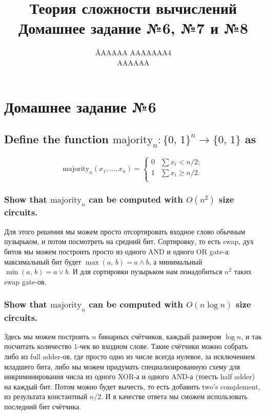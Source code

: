 \documentclass{article}
\title{Теория сложности вычислений \\ Домашнее задание №6, №7 и №8}
\author{\AA{AAAAA AAAAAAA}{4} \\ AAAAAA}
\begin{document}
  \maketitle

  \setcounter{section}{5}
  \section{Домашнее задание №6}
  \setcounter{subsection}{8}
  \subsection{Define the function $\mathrm{majority}_n: \{0,\, 1\}^n \to \{0,\, 1\}$ as}
  $$\mathrm{majority}_n(x_1,\dots,x_n) = \begin{cases}
    0 & \sum x_i < n/2;\\
    1 & \sum x_i \geq n/2.\\
  \end{cases}$$
  \subsubsection{Show that $\mathrm{majority}_n$ can be computed with $O(n^2)$ size circuits.}
  Для этого решения мы можем просто отсортировать входное слово обычным пузырьком, и потом посмотреть на средний бит.
  Сортировку, то есть swap, дух битов мы можем построить просто из одного AND и одного OR gate-а:
  максимальный бит будет $\max(a,\, b) = a \land b$, а минимальный $\min(a,\, b) = a \lor b$.
  И для сортировки пузырьком нам понадобиться $n^2$ таких swap gate-ов.

  \subsubsection{Show that $\mathrm{majority}_n$ can be computed with $O(n\log n)$ size circuits.}
  Здесь мы можем построить $n$ бинарных счётчиков, каждый размером $\log n$, и так посчитать количество $1$-чек во входном слове.
  Такие счётчики можно собрать либо из full adder-ов, где просто одно из числе всегда нулевое, за исключением младшего бита, либо мы можем придумать специализированную схему для инкриминирования числа из одного XOR-а и одного AND-а (тоесть half adder) на каждый бит.
  Потом можно будет вычесть, то есть добавить two's complement, из результата константный $n/2$.
  И в качестве ответа мы сможем использовать последний бит счётчика.
\end{document}
